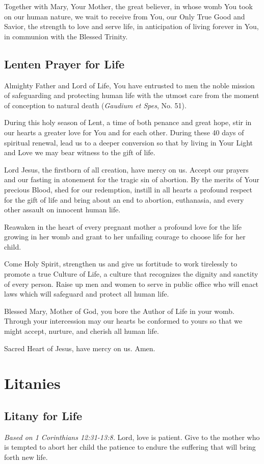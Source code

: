 \documentclass[12pt]{article}
\newcommand{\prayersection}[1]{\section{#1}}
\newcommand{\prayertitle}[1]{\subsection{#1}}
\newcommand{\emphasis}[1]{\emph{#1}}
\newcommand{\emphasis}[1]{\textsl{#1}}
\newcommand{\note}[1]{{\small{\emphasis{#1}}}\newline}
\begin{document}
Together with Mary, Your Mother, the great believer, in whose womb You took on our human nature, we wait to receive from You, our Only True Good and Savior, the strength to love and serve life, in anticipation of living forever in You, in communion with the Blessed Trinity.

\prayertitle{Lenten Prayer for Life}
Almighty Father and Lord of Life,
You have entrusted to men the noble mission of safeguarding and protecting human life with the utmost care from the moment of conception to natural death (\textit{Gaudium et Spes}, No. 51).

During this holy season of Lent, a time of both penance and great hope, stir in our hearts a greater love for You and for each other.
During these 40 days of spiritual renewal, lead us to a deeper conversion so that by living in Your Light and Love we may bear witness to the gift of life.

Lord Jesus, the firstborn of all creation, have mercy on us. 
Accept our prayers and our fasting in atonement for the tragic sin of abortion. 
By the merits of Your precious Blood, shed for our redemption, instill in all hearts a profound respect for the gift of life and bring about an end to abortion, euthanasia, and every other assault on innocent human life.

Reawaken in the heart of every pregnant mother a profound love for the life growing in her womb and grant to her unfailing courage to choose life for her child.

Come Holy Spirit, strengthen us and give us fortitude to work tirelessly to promote a true Culture of Life, a culture that recognizes the dignity and sanctity of every person.
Raise up men and women to serve in public office who will enact laws which will safeguard and protect all human life.

Blessed Mary, Mother of God, you bore the Author of Life in your womb. 
Through your intercession may our hearts be conformed to yours so that we might accept, nurture, and cherish all human life.

Sacred Heart of Jesus, have mercy on us. Amen.

\newpage

\prayersection{Litanies}
\prayertitle{Litany for Life}
\label{prayer:litany_for_life}
\note{Based on 1 Corinthians 12:31-13:8.}
Lord, love is patient.
Give to the mother who is tempted to abort her child the patience to endure the suffering that will bring forth new life.
\end{document}
